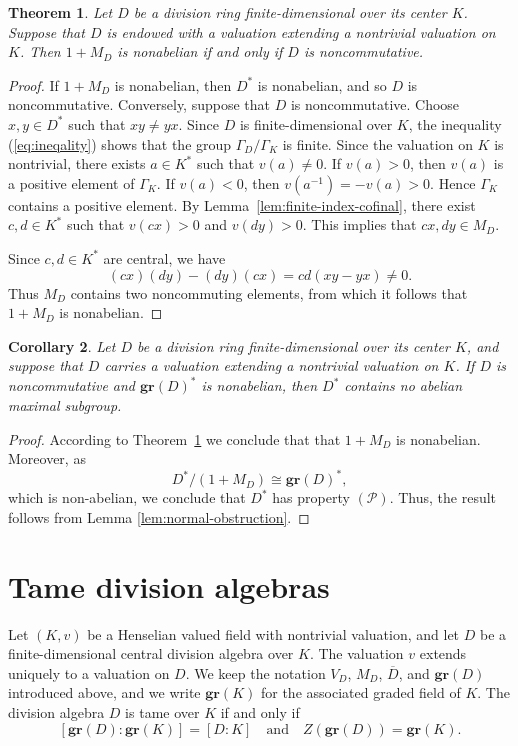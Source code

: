 \documentclass[11pt]{amsart}
\newtheorem{theorem}{Theorem}[section]
\newtheorem{corollary}[theorem]{Corollary}
\theoremstyle{definition}
\begin{document}
\begin{theorem}
\label{thm:normals-nonabelian}
Let $D$ be a division ring finite-dimensional over its center $K$. Suppose that $D$ is endowed with a valuation extending a nontrivial valuation on $K$. Then $1+M_D$ is nonabelian if and only if $D$ is noncommutative.
\end{theorem}

\begin{proof}
If $1+M_D$ is nonabelian, then $D^*$ is nonabelian, and so $D$ is noncommutative. Conversely, suppose that $D$ is noncommutative. Choose $x,y\in D^*$ such that $xy\neq yx$. Since $D$ is finite-dimensional over $K$, the inequality (\ref{eq:ineqality}) shows that the group $\Gamma_D/\Gamma_K$ is finite. Since the valuation on $K$ is nontrivial, there exists $a\in K^*$ such that $v(a)\neq 0$. If $v(a)>0$, then $v(a)$ is a positive element of
$\Gamma_K$. If $v(a)<0$, then $v(a^{-1})=-v(a)>0$. Hence $\Gamma_K$ contains a positive element. By Lemma~\ref{lem:finite-index-cofinal}, there exist $c,d\in K^*$ such that $v(cx)>0$ and $v(dy)>0$. This implies that $cx,dy\in M_D$.

Since $c,d\in K^*$ are central, we have
$$        
(cx)(dy)-(dy)(cx)=cd(xy-yx)\neq 0.
$$
Thus $M_D$ contains two noncommuting elements, from which it follows that $1+M_D$ is nonabelian.
\end{proof}

\begin{corollary}
\label{cor:normal-obstruction}
Let $D$ be a division ring finite-dimensional over its center $K$, and suppose
that $D$ carries a valuation extending a nontrivial valuation on $K$.  If $D$
is noncommutative and $\mathbf{gr}(D)^*$ is nonabelian, then $D^*$ contains
no abelian maximal subgroup.
\end{corollary}

\begin{proof}
According to Theorem~\ref{thm:normals-nonabelian} we conclude that that $1+M_D$ is nonabelian. Moreover, as
$$
        D^*/(1+M_D)\cong \mathbf{gr}(D)^*, 
$$
which is non-abelian, we conclude that $D^*$ has property $(\mathcal P)$. Thus, the result follows from Lemma \ref{lem:normal-obstruction}.
\end{proof}

\section{Tame division algebras}
\label{sec:tame}
Let $(K,v)$ be a Henselian valued field with nontrivial valuation, and let
$D$ be a finite-dimensional central division algebra over $K$. The valuation
$v$ extends uniquely to a valuation on $D$. We keep the notation $V_D$,
$M_D$, $\overline D$, and $\mathbf{gr}(D)$ introduced above, and we write
$\mathbf{gr}(K)$ for the associated graded field of $K$. The division algebra $D$
is tame over $K$ if and only if
\begin{equation}\label{eq:tame}
    [\mathbf{gr}(D):\mathbf{gr}(K)]=[D:K]
    \quad\text{and}\quad
    Z(\mathbf{gr}(D))=\mathbf{gr}(K).
\end{equation}
\end{document}
